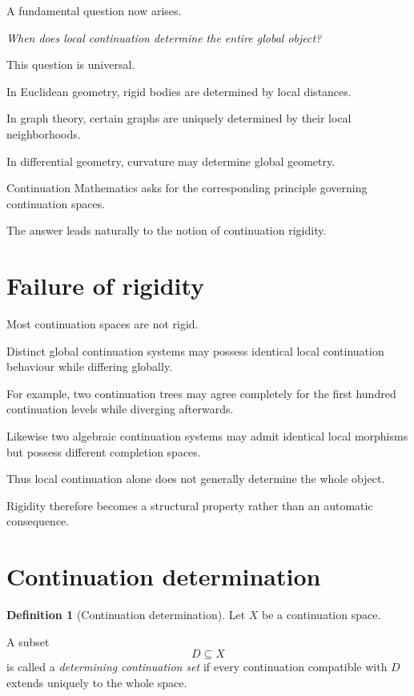 \documentclass[13pt,openany]{book}
\theoremstyle{plain}
\theoremstyle{definition}
\newtheorem{definition}{Definition}[chapter]
\begin{document}
A fundamental question now arises.

\begin{center}
\emph{When does local continuation determine the entire global object?}
\end{center}

This question is universal.

In Euclidean geometry, rigid bodies are determined by local distances.

In graph theory, certain graphs are uniquely determined by their local neighborhoods.

In differential geometry, curvature may determine global geometry.

Continuation Mathematics asks for the corresponding principle governing continuation spaces.

The answer leads naturally to the notion of continuation rigidity.


\section{Failure of rigidity}

Most continuation spaces are not rigid.

Distinct global continuation systems may possess identical local continuation behaviour while differing globally.

For example, two continuation trees may agree completely for the first hundred continuation levels while diverging afterwards.

Likewise two algebraic continuation systems may admit identical local morphisms but possess different completion spaces.

Thus local continuation alone does not generally determine the whole object.

Rigidity therefore becomes a structural property rather than an automatic consequence.


\section{Continuation determination}

\begin{definition}[Continuation determination]
Let $X$ be a continuation space.

A subset
\[
D\subseteq X
\]
is called a
\emph{determining continuation set}
if every continuation compatible with $D$
extends uniquely to the whole space.
\end{definition}
\end{document}
